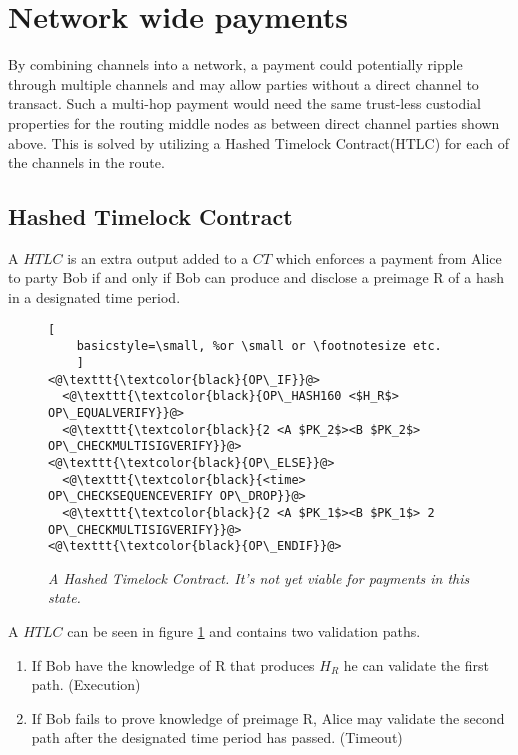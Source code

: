 \section{Network wide payments}

By combining channels into a network, a payment could potentially ripple through multiple channels and may allow parties without a direct channel to transact. Such a multi-hop payment would need the same trust-less custodial properties for the routing middle nodes as between direct channel parties shown above. This is solved by utilizing a Hashed Timelock Contract(HTLC) for each of the channels in the route.

\subsection{Hashed Timelock Contract}

A $HTLC$ is an extra output added to a $CT$ which enforces a payment from Alice to party Bob if and only if Bob can produce and disclose a preimage R of a hash in a designated time period. 

\begin{figure}[hbt!]
	\centering
	\begin{lstlisting}[
	basicstyle=\small, %or \small or \footnotesize etc.
	]
<@\texttt{\textcolor{black}{OP\_IF}}@>
  <@\texttt{\textcolor{black}{OP\_HASH160 <$H_R$> OP\_EQUALVERIFY}}@>
  <@\texttt{\textcolor{black}{2 <A $PK_2$><B $PK_2$> OP\_CHECKMULTISIGVERIFY}}@>  
<@\texttt{\textcolor{black}{OP\_ELSE}}@>
  <@\texttt{\textcolor{black}{<time> OP\_CHECKSEQUENCEVERIFY OP\_DROP}}@>
  <@\texttt{\textcolor{black}{2 <A $PK_1$><B $PK_1$> 2 OP\_CHECKMULTISIGVERIFY}}@>
<@\texttt{\textcolor{black}{OP\_ENDIF}}@>
	\end{lstlisting}
	
	\caption{\textit{ A Hashed Timelock Contract. It's not yet viable for payments in this state.
	}}
	\label{fig:HTLC}
\end{figure}

A $HTLC$ can be seen in figure \ref{fig:HTLC} and contains two validation paths. 

\begin{enumerate}
	\item If Bob have the knowledge of R that produces $H_{R}$ he can validate the first path. (Execution)
	\item If Bob fails to prove knowledge of preimage R, Alice may validate the second path after the designated time period has passed. (Timeout)
\end{enumerate}

